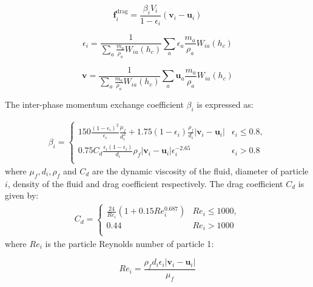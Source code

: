 \documentclass[preprint,12pt]{elsarticle}
\newcommand{\ten}[1]{\ensuremath{\mathbf{#1}}}
\begin{document}
\begin{equation}
\label{eqn:f-drag}
\ten{f}_i^{\text{drag}} = \frac{\beta_i V_i}{1 - \epsilon_i} (\ten{v}_i - \ten{u}_i)
\end{equation}

\begin{equation}
\label{eqn:epsilon_solid}
\epsilon_i = \frac{1}{\sum_a \frac{m_a}{\rho_a} W_{ia} (h_c)} \sum_a \epsilon_a \frac{m_a}{\rho_a} W_{ia} (h_c)
\end{equation}

\begin{equation}
\label{eqn:epsilon_solid}
\ten{v} = \frac{1}{\sum_a \frac{m_a}{\rho_a} W_{ia} (h_c)} \sum_a \ten{u}_a \frac{m_a}{\rho_a} W_{ia} (h_c)
\end{equation}

The inter-phase momentum exchange coefficient $\beta_i$ is expressed as:

\begin{align}
  \label{eq:analytical-x-cm-rolling-cylinder}
  \beta_{i} =
  \begin{cases}
    150 \frac{(1 - \epsilon_i)^2}{\epsilon_i}\frac{\mu_f}{d_i^2} + 1.75 (1 - \epsilon_i)\frac{\rho_f}{d_i} | \ten{v}_i - \ten{u}_i|  & \epsilon_i \leq 0.8, \\
    0.75 C_d \frac{\epsilon_i(1 - \epsilon_i)}{d_i} \rho_f | \ten{v}_i - \ten{u}_i| \epsilon_i^{-2.65} & \epsilon_i > 0.8 \\
\end{cases}
\end{align}
where $\mu_f, d_i, \rho_f$ and $C_d$ are the dynamic viscosity of the fluid,
diameter of particle $i$, density of the fluid and drag coefficient
respectively. The drag coefficient $C_d$ is given by:
\begin{align}
  \label{eq:analytical-x-cm-rolling-cylinder}
  C_d =
  \begin{cases}
    \frac{24}{Re_i}(1 + 0.15 Re_i^{0.687}) & Re_i \leq 1000, \\
    0.44 & Re_i > 1000 \\
\end{cases}
\end{align}
where $Re_i$ is the particle Reynolds number of particle 1:

\begin{equation}
Re_i = \frac{\rho_f d_i \epsilon_i | \ten{v}_i - \ten{u}_i|}{\mu_f}
\end{equation}



\FloatBarrier%
\end{document}

